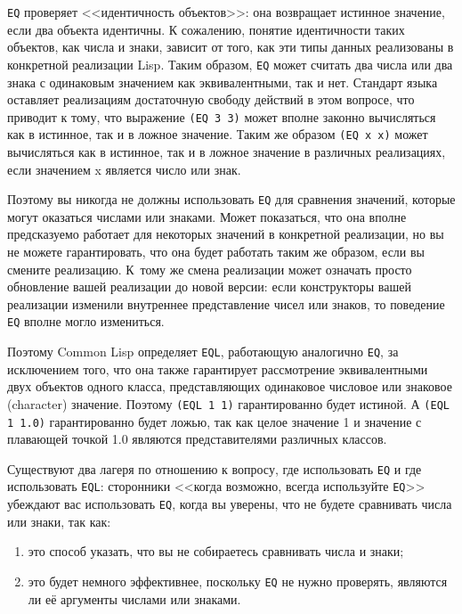 \lstinline{EQ} проверяет <<идентичность объектов>>: она возвращает истинное значение, если
два объекта идентичны. К сожалению, понятие идентичности таких объектов, как числа и
знаки, зависит от того, как эти типы данных реализованы в конкретной реализации
Lisp. Таким образом, \lstinline{EQ} может считать два числа или два знака с одинаковым
значением как эквивалентными, так и нет. Стандарт языка оставляет реализациям достаточную
свободу действий в этом вопросе, что приводит к тому, что выражение \lstinline{(EQ 3 3)}
может вполне законно вычисляться как в истинное, так и в ложное значение. Таким же образом
\lstinline{(EQ x x)} может вычисляться как в истинное, так и в ложное значение в различных
реализациях, если значением x является число или знак.

Поэтому вы никогда не должны использовать \lstinline{EQ} для сравнения значений, которые
могут оказаться числами или знаками. Может показаться, что она вполне предсказуемо
работает для некоторых значений в конкретной реализации, но вы не можете гарантировать,
что она будет работать таким же образом, если вы смените реализацию. К~тому же смена
реализации может означать просто обновление вашей реализации до новой версии: если
конструкторы вашей реализации изменили внутреннее представление чисел или знаков, то
поведение \lstinline{EQ} вполне могло измениться.

Поэтому Common Lisp определяет \lstinline{EQL}, работающую аналогично \lstinline{EQ}, за
исключением того, что она также гарантирует рассмотрение эквивалентными двух объектов
одного класса, представляющих одинаковое числовое или знаковое (character)
значение. Поэтому \lstinline{(EQL 1 1)} гарантированно будет истиной. А \lstinline{(EQL 1 1.0)}
гарантированно будет ложью, так как целое значение 1 и значение с плавающей точкой 1.0
являются представителями различных классов.

Существуют два лагеря по отношению к вопросу, где использовать \lstinline{EQ} и где
использовать \lstinline{EQL}: сторонники <<когда возможно, всегда используйте \lstinline{EQ}>>
убеждают вас использовать \lstinline{EQ}, когда вы уверены, что не будете сравнивать числа
или знаки, так как:

\begin{enumerate}
\item это способ указать, что вы не собираетесь сравнивать числа и знаки; 

\item это будет немного эффективнее, поскольку \lstinline{EQ} не нужно проверять, являются
  ли её аргументы числами или знаками.
\end{enumerate}

